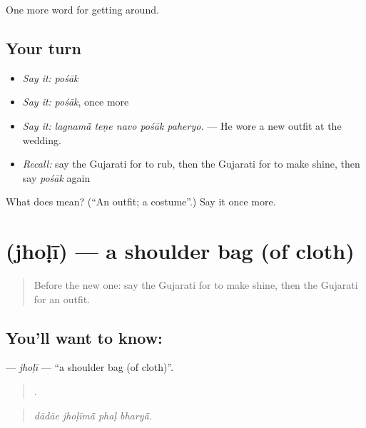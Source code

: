 \begin{grammarlens}[title={What you've built}]
One more word for getting around.
\end{grammarlens}

\subsection*{Your turn}
\begin{itemize}
\raggedright
  \item \emph{Say it:} \emph{pośāk}
  \item \emph{Say it:} \emph{pośāk}, once more
  \item \emph{Say it:} \emph{lagnamā̃ teṇe navo pośāk paheryo.} — He wore a new outfit at the wedding.
  \item \emph{Recall:} say the Gujarati for to rub, then the Gujarati for to make shine, then say \emph{pośāk} again
\end{itemize}

\begin{tcolorbox}[breakable,colback=teal!4,colframe=teal!35!black,title={Before you move on}]
What does  mean? (\textquotedblleft{}An outfit; a costume\textquotedblright{}.) Say it once more.
\end{tcolorbox}
\section[\texorpdfstring{\gu{ઝોળી} (jhoḷī)}{ઝોળી (jhoḷī)}]{ (jhoḷī) — a shoulder bag (of cloth)}

\label{lesson:GU-C433-jholi}



\begin{quote}
Before the new one: say the Gujarati for to make shine, then the Gujarati for an outfit.
\end{quote}

\subsection*{You'll want to know: }
\textbf{} — \emph{jhoḷī} — \textquotedblleft{}a shoulder bag (of cloth)\textquotedblright{}.

\begin{quote}
   .
\end{quote}

\begin{quote}
\emph{dādāe jhoḷīmā̃ phaḷ bharyā̃.}
\end{quote}

